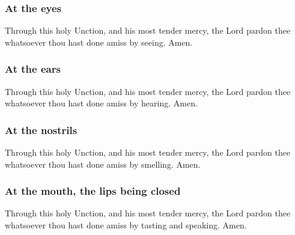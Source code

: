 \vspace{-0.25\baselineskip}

\subsubsection{At the eyes}

\vspace{-0.1\baselineskip}
\par\noindent
Through this holy {} Unction, and his most tender mercy, the Lord pardon thee whatsoever thou hast done amiss by seeing. Amen.

\vspace{-0.25\baselineskip}

\subsubsection{At the ears}

\vspace{-0.1\baselineskip}
\par\noindent
Through this holy {} Unction, and his most tender mercy, the Lord pardon thee whatsoever thou hast done amiss by hearing. Amen.

\vspace{-0.25\baselineskip}

\subsubsection{At the nostrils}

\vspace{-0.1\baselineskip}
\par\noindent
Through this holy {} Unction, and his most tender mercy, the Lord pardon thee whatsoever thou hast done amiss by smelling. Amen.

\vspace{-0.25\baselineskip}

\subsubsection{At the mouth, the lips being closed}

\vspace{-0.1\baselineskip}
\par\noindent
Through this holy {} Unction, and his most tender mercy, the Lord pardon thee whatsoever thou hast done amiss by tasting and speaking. Amen.

